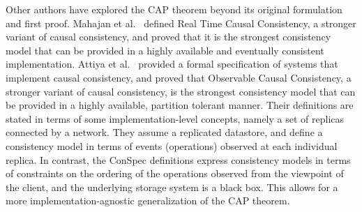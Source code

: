 \documentclass[journal, compsoc]{IEEEtran}
\begin{document}
	Other authors have explored the CAP theorem beyond its original formulation and first proof.
	Mahajan et al.~\cite{mahajan11cacTR} defined Real Time Causal Consistency, a stronger variant of causal consistency, and proved that it is the strongest consistency model that can be provided in a highly available and eventually consistent implementation.
	Attiya et al.~\cite{Attiya:2015:LHE:2767386.2767419}  provided a formal specification of systems that implement causal consistency, and proved that Observable Causal Consistency, a stronger variant of causal consistency, is the strongest consistency model that can be provided in a highly available, partition tolerant manner. Their definitions are stated in terms of some implementation-level concepts, namely a set of replicas connected by a network. They assume a replicated datastore, and define a consistency model in terms of events (operations) observed at each individual replica. %
	In contrast, the ConSpec definitions express consistency models in terms of constraints on the ordering of the operations observed from the viewpoint of the client, and the underlying storage system is a black box. This allows for a more implementation-agnostic generalization of the CAP theorem.
	
\end{document}
